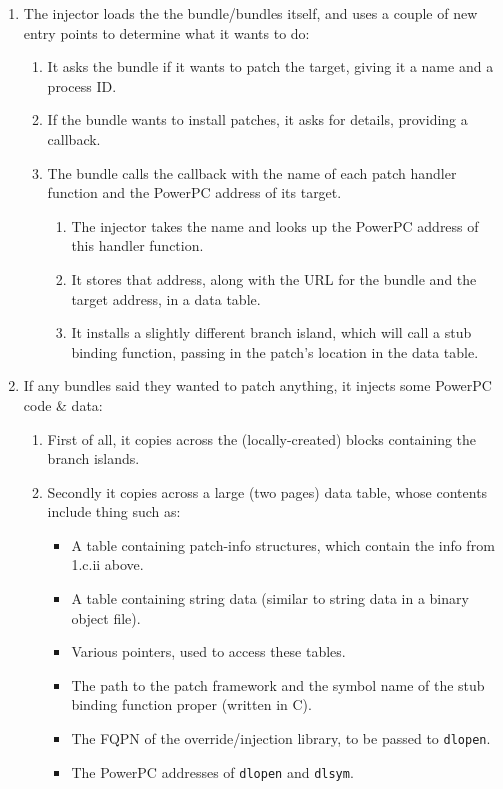 \documentclass[english]{article}
\begin{document}
\begin{enumerate}
  \item The injector loads the the bundle/bundles itself, and uses a couple of new entry points to determine what it wants to do:
  \begin{enumerate}
    \item It asks the bundle if it wants to patch the target, giving it a name and a process ID.
    \item If the bundle wants to install patches, it asks for details, providing a callback.
    \item The bundle calls the callback with the name of each patch handler function and the PowerPC address of its target.
    \begin{enumerate}
      \item The injector takes the name and looks up the PowerPC address of this handler function.
      \item It stores that address, along with the URL for the bundle and the target address, in a data table.
      \item It installs a slightly different branch island, which will call a stub binding function, passing in the patch's location in the data table.
    \end{enumerate}
  \end{enumerate}
  \item If any bundles said they wanted to patch anything, it injects some PowerPC code \& data:
  \begin{enumerate}
    \item First of all, it copies across the (locally-created) blocks containing the branch islands.
    \item Secondly it copies across a large (two pages) data table, whose contents include thing such as:
    \begin{itemize}
      \item A table containing patch-info structures, which contain the info from 1.c.ii above.
      \item A table containing string data (similar to string data in a binary object file).
      \item Various pointers, used to access these tables.
      \item The path to the patch framework and the symbol name of the stub binding function proper (written in C).
      \item The FQPN of the override/injection library, to be passed to \texttt{dlopen}.
      \item The PowerPC addresses of \texttt{dlopen} and \texttt{dlsym}.

\end{itemize}
\end{enumerate}
\end{enumerate}
\end{document}
